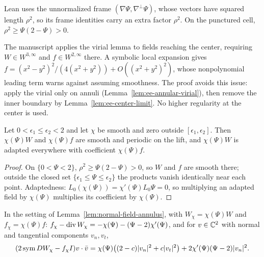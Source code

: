 \begin{remark}
Lean uses the unnormalized frame $(\nabla\Psi,\nabla^\perp\Psi)$, whose
vectors have squared length $\rho^2$, so its frame identities carry an
extra factor $\rho^2$. On the punctured cell,
$\rho^2\ge\Psi(2-\Psi)>0$.
\end{remark}

\begin{remark}
The manuscript applies the virial lemma to fields reaching the center,
requiring $W\in W^{3,\infty}$ and $f\in W^{2,\infty}$ there. A symbolic
local expansion gives
$f=(x^2-y^2)^2/(4(x^2+y^2))+O((x^2+y^2)^2)$, whose nonpolynomial
leading term warns against assuming smoothness.
The proof avoids this issue: apply the virial only on annuli
(Lemma~\ref{lem:ee-annular-virial}), then remove the inner boundary by
Lemma~\ref{lem:ee-center-limit}. No higher regularity at the center is used.
\end{remark}

\begin{lemma}
\label{lem:normal-field-annulus}
\leanok
Let $0<\epsilon_1\le\epsilon_2<2$ and let $\chi$ be smooth and zero outside
$[\epsilon_1,\epsilon_2]$. Then $\chi(\Psi)W$ and $\chi(\Psi)f$ are smooth and periodic on the
lift, and $\chi(\Psi)W$ is adapted everywhere with coefficient $\chi(\Psi)f$.
\end{lemma}

\begin{proof}
\leanok
On $\{0<\Psi<2\}$, $\rho^2\ge\Psi(2-\Psi)>0$, so $W$ and $f$ are smooth there; outside the
closed set $\{\epsilon_1\le\Psi\le\epsilon_2\}$ the products vanish identically near each point.
Adaptedness: $L_0(\chi(\Psi))=\chi'(\Psi)L_0\Psi=0$, so multiplying an adapted field by
$\chi(\Psi)$ multiplies its coefficient by $\chi(\Psi)$.
\end{proof}

\begin{lemma}
\label{lem:normal-field-cutoff-algebra}
\leanok
In the setting of Lemma~\ref{lem:normal-field-annulus}, with $W_\chi=\chi(\Psi)W$ and
$f_\chi=\chi(\Psi)f$: $f_\chi-\operatorname{div} W_\chi=-\chi(\Psi)-(\Psi-2)\chi'(\Psi)$, and for
$v\in\mathbb{C}^2$ with normal and tangential components $v_n,v_t$,
\[
  (2\operatorname{sym} DW_\chi-f_\chi I)v\cdot\bar v
  =\chi(\Psi)\bigl((2-c)|v_n|^2+c|v_t|^2\bigr)+2\chi'(\Psi)(\Psi-2)|v_n|^2 .
\]
\end{lemma}

